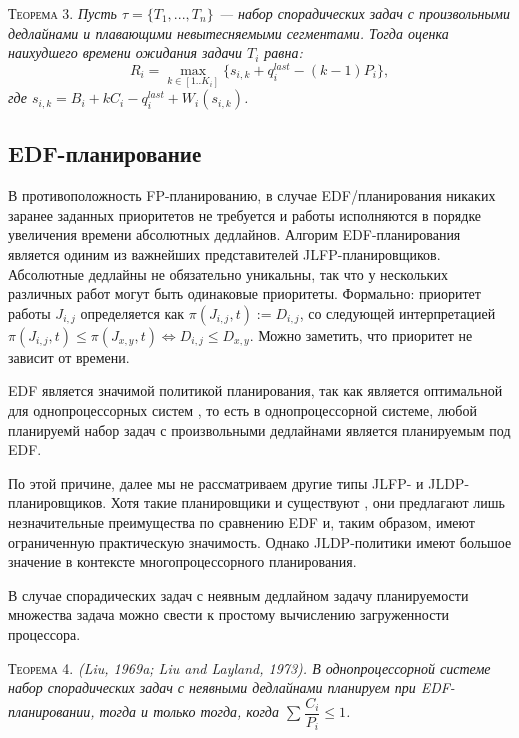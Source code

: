 \documentclass[14pt]{matmex-diploma-custom}
\begin{document}
\textsc{Теорема 3.} 
\textit{Пусть $\tau = \{T_1, ... , T_n\}$ --- набор спорадических задач с 
  произвольными дедлайнами и плавающими невытесняемыми сегментами. Тогда оценка 
  наихудшего времени ожидания задачи $T_i$ равна: $$R_i = \max_{k \in [1..K_i]} \{ s_{i,k} + q^{last}_i - (k - 1) P_i\},$$
  где $s_{i,k} = B_i + kC_i - q^{last}_i + W_i(s_{i,k})$.
}

\subsection{EDF-планирование}

В противоположность FP-планированию, в случае EDF\-/планирования никаких заранее заданных приоритетов не требуется и работы исполняются в порядке увеличения времени абсолютных дедлайнов. Алгорим EDF-планирования является одиним из важнейших представителей JLFP-планировщиков. Абсолютные дедлайны не обязательно уникальны, так что у нескольких различных работ могут быть одинаковые приоритеты. Формально: приоритет работы $J_{i,j}$ определяется как $\pi (J_{i, j}, t) := D_{i, j}$, со следующей интерпретацией $\pi (J_{i, j}, t) \leq \pi (J_{x, y}, t) \Leftrightarrow D_{i , j} \leq D_{x, y}$. Можно заметить, что приоритет не зависит от времени.

EDF является значимой политикой планирования, так как является оптимальной для однопроцессорных систем \cite{Dhall, Liu1973SchedulingAF}, то есть в однопроцессорной системе, любой планируемй набор задач с произвольными дедлайнами является планируемым под EDF.

По этой причине, далее мы не рассматриваем другие типы JLFP- и JLDP- планировщиков. Хотя такие планировщики и существуют \cite{Davis1993SchedulingST}, они предлагают лишь незначительные преимущества по сравнению EDF и, таким образом, имеют ограниченную практическую значимость. Однако JLDP-политики имеют большое значение в контексте многопроцессорного планирования.

В случае спорадических задач с неявным дедлайном задачу планируемости множества задача можно свести к простому вычислению загруженности процессора.


\textsc{Теорема 4. }
\textit{(Liu, 1969a; Liu and Layland, 1973). В однопроцессорной системе набор спорадических задач с неявными дедлайнами планируем при EDF-планировании, тогда и только тогда, когда $\sum_{} \dfrac{C_i}{P_i} \leq 1$.
}
\end{document}
